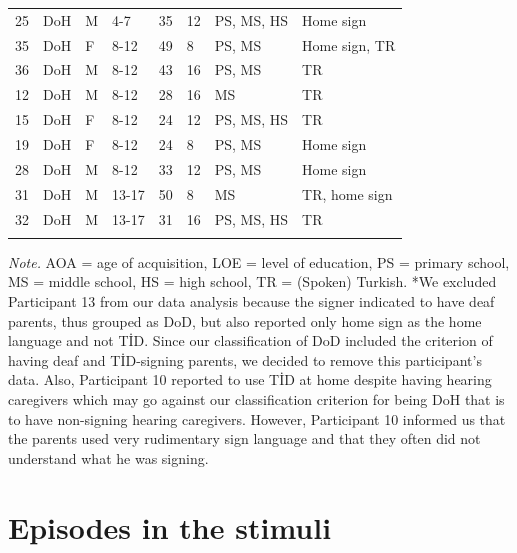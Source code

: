 \documentclass[review]{elsarticle} %
\begin{document}
\begin{table}[hbt!]
\begin{center}
\begin{threeparttable}
{\begin{tabular}{llllllll}
25 & DoH & M & 4-7 & 35 & 12 & PS, MS, HS & Home sign\\
35 & DoH & F & 8-12 & 49 & 8 & PS, MS & Home sign, TR\\
36 & DoH & M & 8-12 & 43 & 16 & PS, MS & TR\\
12 & DoH & M & 8-12 & 28 & 16 & MS & TR\\
15 & DoH & F & 8-12 & 24 & 12 & PS, MS, HS & TR\\
19 & DoH & F & 8-12 & 24 & 8 & PS, MS & Home sign\\
28 & DoH & M & 8-12 & 33 & 12 & PS, MS & Home sign\\
31 & DoH & M & 13-17 & 50 & 8 & MS & TR, home sign\\
32 & DoH & M & 13-17 & 31 & 16 & PS, MS, HS & TR\\
\bottomrule
\addlinespace
\end{tabular}

}

\begin{tablenotes}[para]
\normalsize{\textit{Note.} AOA = age of acquisition, LOE = level of education, PS = primary school, MS = middle school, HS = high school, TR = (Spoken) Turkish. *We excluded Participant 13 from our data analysis because the signer indicated to have deaf parents, thus grouped as DoD, but also reported only home sign as the home language and not TİD. Since our classification of DoD included the criterion of having deaf and TİD-signing parents, we decided to remove this participant's data. Also, Participant 10 reported to use TİD at home despite having hearing caregivers which may go against our classification criterion for being DoH that is to have non-signing hearing caregivers. However, Participant 10 informed us that the parents used very rudimentary sign language and that they often did not understand what he was signing.}
\end{tablenotes}

\end{threeparttable}
\end{center}

\end{table}

\clearpage

\setlength{\columnsep}{10pt}
\twocolumn
\linespread{1}
\justifying
\footnotesize

\hypertarget{episodes-in-the-stimuli}{%
\section{Episodes in the stimuli}\label{episodes-in-the-stimuli}}
\end{document}
